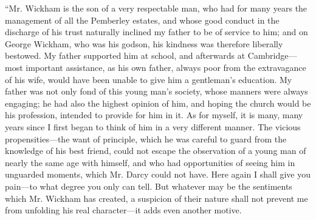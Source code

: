 “Mr. Wickham is the son of a very respectable man, who had for many years the management of all the Pemberley estates, and whose good conduct in the discharge of his trust naturally inclined my father to be of service to him; and on George Wickham, who was his godson, his kindness was therefore liberally bestowed. My father supported him at school, and afterwards at Cambridge---most important assistance, as his own father, always poor from the extravagance of his wife, would have been unable to give him a gentleman's education. My father was not only fond of this young man's society, whose manners were always engaging; he had also the highest opinion of him, and hoping the church would be his profession, intended to provide for him in it. As for myself, it is many, many years since I first began to think of him in a very different manner. The vicious propensities---the want of principle, which he was careful to guard from the knowledge of his best friend, could not escape the observation of a young man of nearly the same age with himself, and who had opportunities of seeing him in unguarded moments, which Mr. Darcy could not have. Here again I shall give you pain---to what degree you only can tell. But whatever may be the sentiments which Mr. Wickham has created, a suspicion of their nature shall not prevent me from unfolding his real character---it adds even another motive.

